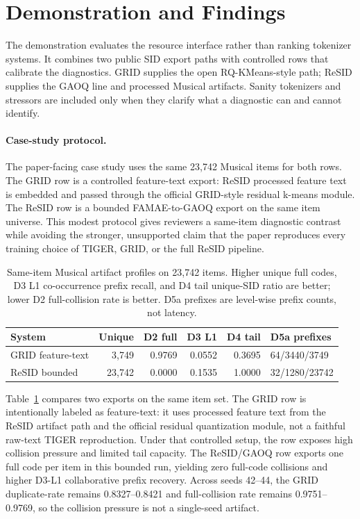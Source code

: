\section{Demonstration and Findings}

The demonstration evaluates the resource interface rather than ranking
tokenizer systems. It combines two public SID export paths with controlled rows
that calibrate the diagnostics. GRID supplies the open RQ-KMeans-style path;
ReSID supplies the GAOQ line and processed Musical artifacts. Sanity tokenizers
and stressors are included only when they clarify what a diagnostic can and
cannot identify.

\paragraph{Case-study protocol.}
The paper-facing case study uses the same 23,742 Musical items for both rows.
The GRID row is a controlled feature-text export: ReSID processed feature text
is embedded and passed through the official GRID-style residual k-means module.
The ReSID row is a bounded FAMAE-to-GAOQ export on the same item universe. This
modest protocol gives reviewers a same-item diagnostic contrast while avoiding
the stronger, unsupported claim that the paper reproduces every training choice
of TIGER, GRID, or the full ReSID pipeline.

\begin{table}[t]
\caption{Same-item Musical artifact profiles on 23,742 items. Higher unique
full codes, D3 L1 co-occurrence prefix recall, and D4 tail unique-SID ratio are
better; lower D2 full-collision rate is better. D5a prefixes are level-wise
prefix counts, not latency.}
\label{tab:musical-diagnostic}
\small
\setlength{\tabcolsep}{2.0pt}
\begin{tabular}{@{}lrrrrl@{}}
\toprule
System & Unique & D2 full & D3 L1 & D4 tail & D5a prefixes \\
\midrule
GRID feature-text & 3,749 & 0.9769 & 0.0552 & 0.3695 & 64/3440/3749 \\
ReSID bounded & 23,742 & 0.0000 & 0.1535 & 1.0000 & 32/1280/23742 \\
\bottomrule
\end{tabular}
\end{table}

Table~\ref{tab:musical-diagnostic} compares two exports on the same item set.
The GRID row is intentionally labeled as feature-text: it uses processed
feature text from the ReSID artifact path and the official residual
quantization module, not a faithful raw-text TIGER reproduction. Under that
controlled setup, the row exposes high collision pressure and limited tail
capacity. The ReSID/GAOQ row exports one full code per item in this bounded
run, yielding zero full-code collisions and higher D3-L1 collaborative prefix
recovery. Across seeds 42--44, the GRID duplicate-\sid rate remains
0.8327--0.8421 and full-collision rate remains 0.9751--0.9769, so the collision
pressure is not a single-seed artifact.

